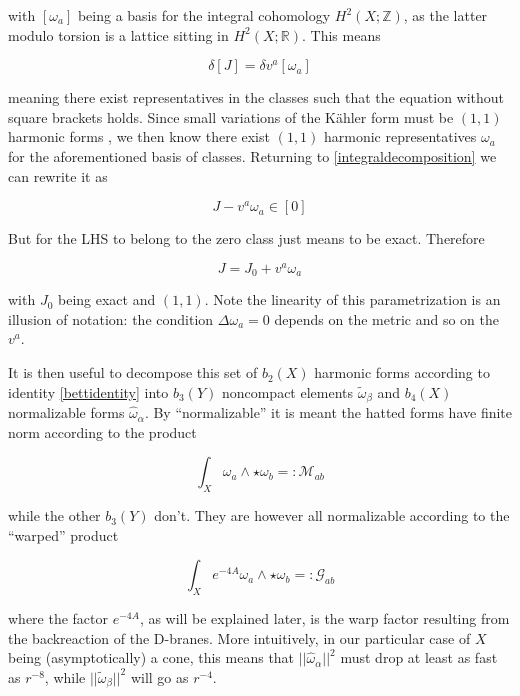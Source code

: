 with $[\omega_a]$ being a basis for the integral cohomology $H^2(X;\mathbb Z)$, as the latter modulo torsion is a lattice sitting in $H^2(X;\mathbb R)$. This means

\begin{equation}
	\delta [J] = \delta v^a [\omega_a]
\end{equation}

meaning there exist representatives in the classes such that the equation without square brackets holds. Since small variations of the K\"ahler form must be $(1,1)$ harmonic forms \cite{CANDELAScy}, we then know there exist $(1,1)$ harmonic representatives $\omega_a$ for the aforementioned basis of classes. Returning to \eqref{integraldecomposition} we can rewrite it as

\begin{equation}
	J - v^a \omega_a \in [0]
\end{equation}

But for the LHS to belong to the zero class just means to be exact. Therefore

\begin{equation}
	J = J_0 + v^a \omega_a \label{JandJ0}
\end{equation}

with $J_0$ being exact and $(1,1)$. Note the linearity of this parametrization is an illusion of notation: the condition $\Delta \omega_a = 0$ depends on the metric and so on the $v^a$.

It is then useful to decompose this set of $b_2(X)$ harmonic forms according to identity \eqref{bettidentity} into $b_3(Y)$ noncompact elements $\tilde\omega_\beta$ and $b_4(X)$ normalizable forms $\hat\omega_\alpha$. By ``normalizable'' it is meant the hatted forms have finite norm according to the product

\begin{equation}
	\int_X \omega_a \wedge \star \omega_b =: \mathcal{M}_{ab} \label{defM}
\end{equation}

while the other $b_3(Y)$ don't. They are however all normalizable according to the ``warped'' product

\begin{equation}
	\int_X e^{-4A} \omega_a \wedge \star \omega_b =: \mathcal{G}_{ab} \label{defG}
\end{equation}

where the factor $e^{-4A}$, as will be explained later, is the warp factor resulting from the backreaction of the D-branes. More intuitively, in our particular case of $X$ being (asymptotically) a cone, this means that $||\hat\omega_\alpha||^2$ must drop at least as fast as $r^{-8}$, while $||\tilde\omega_\beta||^2$ will go as $r^{-4}$.\\

